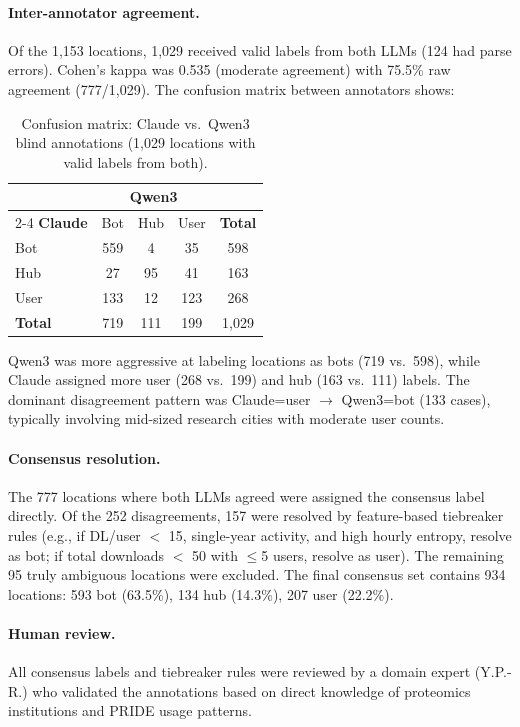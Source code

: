 \documentclass[11pt,a4paper]{article}
\begin{document}
\paragraph{Inter-annotator agreement.}
Of the 1,153 locations, 1,029 received valid labels from both LLMs (124 had parse errors). Cohen's kappa was 0.535 (moderate agreement) with 75.5\% raw agreement (777/1,029). The confusion matrix between annotators shows:

\begin{table}[H]
\centering
\caption{Confusion matrix: Claude vs.\ Qwen3 blind annotations (1,029 locations with valid labels from both).}
\label{tab:llm_confusion}
\small
\begin{tabular}{lcccc}
\toprule
& \multicolumn{3}{c}{\textbf{Qwen3}} & \\
\cmidrule{2-4}
\textbf{Claude} & Bot & Hub & User & \textbf{Total} \\
\midrule
Bot & 559 & 4 & 35 & 598 \\
Hub & 27 & 95 & 41 & 163 \\
User & 133 & 12 & 123 & 268 \\
\midrule
\textbf{Total} & 719 & 111 & 199 & 1,029 \\
\bottomrule
\end{tabular}
\end{table}

Qwen3 was more aggressive at labeling locations as bots (719 vs.\ 598), while Claude assigned more user (268 vs.\ 199) and hub (163 vs.\ 111) labels. The dominant disagreement pattern was Claude=user $\to$ Qwen3=bot (133 cases), typically involving mid-sized research cities with moderate user counts.

\paragraph{Consensus resolution.}
The 777 locations where both LLMs agreed were assigned the consensus label directly. Of the 252 disagreements, 157 were resolved by feature-based tiebreaker rules (e.g., if DL/user $<$ 15, single-year activity, and high hourly entropy, resolve as bot; if total downloads $<$ 50 with $\leq$5 users, resolve as user). The remaining 95 truly ambiguous locations were excluded. The final consensus set contains 934 locations: 593 bot (63.5\%), 134 hub (14.3\%), 207 user (22.2\%).

\paragraph{Human review.}
All consensus labels and tiebreaker rules were reviewed by a domain expert (Y.P.-R.) who validated the annotations based on direct knowledge of proteomics institutions and PRIDE usage patterns.
\end{document}
